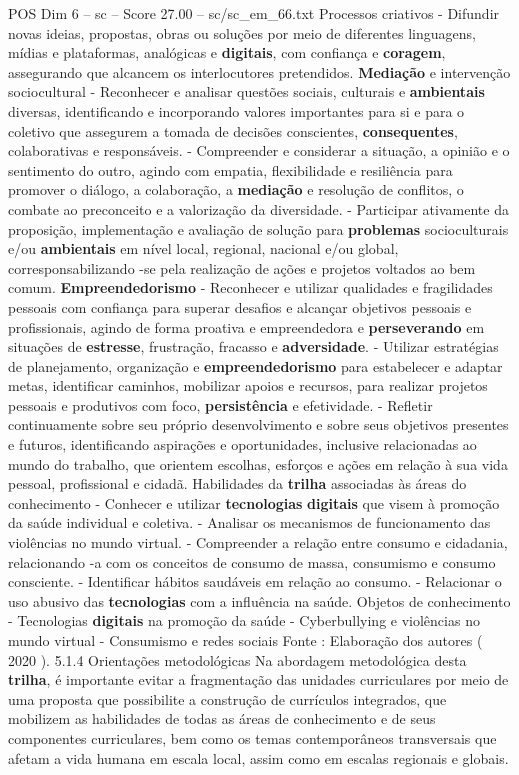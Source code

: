 \begin{textsample}{POS Dim 6 – sc – Score 27.00 – sc/sc\_em\_66.txt}
Processos criativos - Difundir novas ideias, propostas, obras ou soluções por meio de diferentes linguagens, mídias e plataformas, analógicas e \textbf{digitais}, com confiança e \textbf{coragem}, assegurando que alcancem os interlocutores pretendidos. \textbf{Mediação} e intervenção sociocultural - Reconhecer e analisar questões sociais, culturais e \textbf{ambientais} diversas, identificando e incorporando valores importantes para si e para o coletivo que assegurem a tomada de decisões conscientes, \textbf{consequentes}, colaborativas e responsáveis. - Compreender e considerar a situação, a opinião e o sentimento do outro, agindo com empatia, flexibilidade e resiliência para promover o diálogo, a colaboração, a \textbf{mediação} e resolução de conflitos, o combate ao preconceito e a valorização da diversidade. - Participar ativamente da proposição, implementação e avaliação de solução para \textbf{problemas} socioculturais e/ou \textbf{ambientais} em nível local, regional, nacional e/ou global, corresponsabilizando -se pela realização de ações e projetos voltados ao bem comum. \textbf{Empreendedorismo} - Reconhecer e utilizar qualidades e fragilidades pessoais com confiança para superar desafios e alcançar objetivos pessoais e profissionais, agindo de forma proativa e empreendedora e \textbf{perseverando} em situações de \textbf{estresse}, frustração, fracasso e \textbf{adversidade}. - Utilizar estratégias de planejamento, organização e \textbf{empreendedorismo} para estabelecer e adaptar metas, identificar caminhos, mobilizar apoios e recursos, para realizar projetos pessoais e produtivos com foco, \textbf{persistência} e efetividade. - Refletir continuamente sobre seu próprio desenvolvimento e sobre seus objetivos presentes e futuros, identificando aspirações e oportunidades, inclusive relacionadas ao mundo do trabalho, que orientem escolhas, esforços e ações em relação à sua vida pessoal, profissional e cidadã.
Habilidades da \textbf{trilha} associadas às áreas do conhecimento - Conhecer e utilizar \textbf{tecnologias} \textbf{digitais} que visem à promoção da saúde individual e coletiva. - Analisar os mecanismos de funcionamento das violências no mundo virtual. - Compreender a relação entre consumo e cidadania, relacionando -a com os conceitos de consumo de massa, consumismo e consumo consciente. - Identificar hábitos saudáveis em relação ao consumo. - Relacionar o uso abusivo das \textbf{tecnologias} com a influência na saúde.
Objetos de conhecimento - Tecnologias \textbf{digitais} na promoção da saúde - Cyberbullying e violências no mundo virtual - Consumismo e redes sociais Fonte : Elaboração dos autores ( 2020 ). 5.1.4 Orientações metodológicas Na abordagem metodológica desta \textbf{trilha}, é importante evitar a fragmentação das unidades curriculares por meio de uma proposta que possibilite a construção de currículos integrados, que mobilizem as habilidades de todas as áreas de conhecimento e de seus componentes curriculares, bem como os temas contemporâneos transversais que afetam a vida humana em escala local, assim como em escalas regionais e globais.

\end{textsample}
